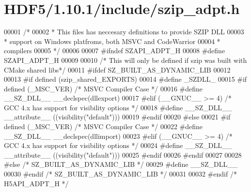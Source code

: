 \hypertarget{_h_d_f5_21_810_81_2include_2szip__adpt_8h_source}{}\section{H\+D\+F5/1.10.1/include/szip\+\_\+adpt.h}
\label{_h_d_f5_21_810_81_2include_2szip__adpt_8h_source}

\begin{DoxyCode}
00001 \textcolor{comment}{/*}
00002 \textcolor{comment}{ * This files has neccesary definitions to provide SZIP DLL }
00003 \textcolor{comment}{ * support on Windows platfroms, both MSVC and CodeWarrior }
00004 \textcolor{comment}{ * compilers}
00005 \textcolor{comment}{ */}
00006 
00007 \textcolor{preprocessor}{#ifndef SZAPI\_ADPT\_H}
00008 \textcolor{preprocessor}{#define SZAPI\_ADPT\_H}
00009 
00010 \textcolor{comment}{/* This will only be defined if szip was built with CMake shared libs*/}
00011 \textcolor{preprocessor}{#ifdef SZ\_BUILT\_AS\_DYNAMIC\_LIB}
00012 
00013 \textcolor{preprocessor}{#if defined (szip\_shared\_EXPORTS)}
00014 \textcolor{preprocessor}{  #define \_SZDLL\_}
00015 \textcolor{preprocessor}{  #if defined (\_MSC\_VER)  }\textcolor{comment}{/* MSVC Compiler Case */}\textcolor{preprocessor}{}
00016 \textcolor{preprocessor}{    #define \_\_SZ\_DLL\_\_ \_\_declspec(dllexport)}
00017 \textcolor{preprocessor}{  #elif (\_\_GNUC\_\_ >= 4)  }\textcolor{comment}{/* GCC 4.x has support for visibility options */}\textcolor{preprocessor}{}
00018 \textcolor{preprocessor}{    #define \_\_SZ\_DLL\_\_ \_\_attribute\_\_ ((visibility("default")))}
00019 \textcolor{preprocessor}{  #endif}
00020 \textcolor{preprocessor}{#else}
00021 \textcolor{preprocessor}{  #if defined (\_MSC\_VER)  }\textcolor{comment}{/* MSVC Compiler Case */}\textcolor{preprocessor}{}
00022 \textcolor{preprocessor}{    #define \_\_SZ\_DLL\_\_ \_\_declspec(dllimport)}
00023 \textcolor{preprocessor}{  #elif (\_\_GNUC\_\_ >= 4)  }\textcolor{comment}{/* GCC 4.x has support for visibility options */}\textcolor{preprocessor}{}
00024 \textcolor{preprocessor}{    #define \_\_SZ\_DLL\_\_ \_\_attribute\_\_ ((visibility("default")))}
00025 \textcolor{preprocessor}{  #endif}
00026 \textcolor{preprocessor}{#endif}
00027 
00028 \textcolor{preprocessor}{#else }\textcolor{comment}{/* SZ\_BUILT\_AS\_DYNAMIC\_LIB */}\textcolor{preprocessor}{}
00029 \textcolor{preprocessor}{  #define \_\_SZ\_DLL\_\_}
00030 \textcolor{preprocessor}{#endif }\textcolor{comment}{/* SZ\_BUILT\_AS\_DYNAMIC\_LIB */}\textcolor{preprocessor}{}
00031 
00032 \textcolor{preprocessor}{#endif }\textcolor{comment}{/* H5API\_ADPT\_H */}\textcolor{preprocessor}{}
\end{DoxyCode}
